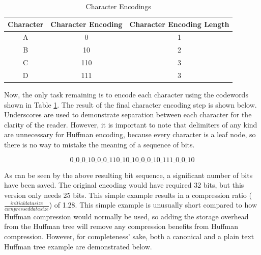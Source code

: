 \documentclass[doublespace,nopageskip]{VTthesis}
\begin{document}
\begin{table}[htb]
	\centering
	\caption{Character Encodings}
	\begin{tabular}{ccc}
	    \toprule
	    Character & Character Encoding & Character Encoding Length\\
	    \midrule
	    A & 0 & 1\\
	    \midrule
	    B & 10 & 2\\
	    \midrule
	    C & 110 & 3\\
	    \midrule
	    D & 111 & 3\\
	    \bottomrule
	\end{tabular}
	\label{tab:huffman_encodings}
\end{table}

Now, the only task remaining is to encode each character using the codewords shown in Table \ref{tab:huffman_encodings}. The result of the final character encoding step is shown below. Underscores are used to demonstrate separation between each character for the clarity of the reader. However, it is important to note that delimiters of any kind are unnecessary for Huffman encoding, because every character is a leaf node, so there is no way to mistake the meaning of a sequence of bits.

\[0\_0\_0\_10\_0\_0\_110\_10\_10\_0\_0\_10\_111\_0\_0\_10\]

As can be seen by the above resulting bit sequence, a significant number of bits have been saved. The original encoding would have required 32 bits, but this version only needs 25 bits. This simple example results in a compression ratio ($\frac{initial data size}{compressed data size}$) of 1.28. This simple example is unusually short compared to how Huffman compression would normally be used, so adding the storage overhead from the Huffman tree will remove any compression benefits from Huffman compression. However, for completeness' sake, both a canonical and a plain text Huffman tree example are demonstrated below.
\end{document}
